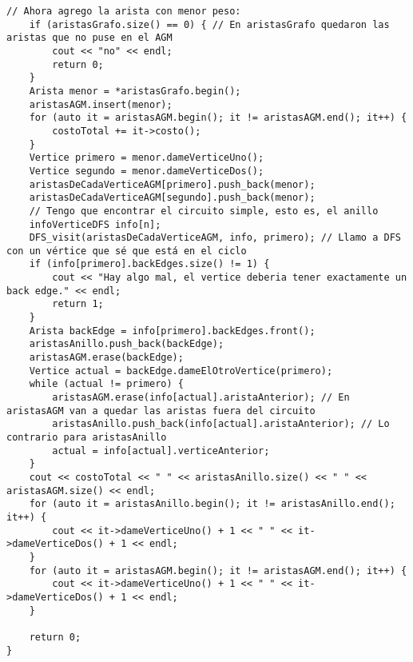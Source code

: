 \begin{lstlisting}[frame=single]
    // Ahora agrego la arista con menor peso:
    if (aristasGrafo.size() == 0) { // En aristasGrafo quedaron las aristas que no puse en el AGM
        cout << "no" << endl;
        return 0;
    }
    Arista menor = *aristasGrafo.begin();
    aristasAGM.insert(menor);
    for (auto it = aristasAGM.begin(); it != aristasAGM.end(); it++) {
        costoTotal += it->costo();
    }
    Vertice primero = menor.dameVerticeUno();
    Vertice segundo = menor.dameVerticeDos();
    aristasDeCadaVerticeAGM[primero].push_back(menor);
    aristasDeCadaVerticeAGM[segundo].push_back(menor);
    // Tengo que encontrar el circuito simple, esto es, el anillo
    infoVerticeDFS info[n];
    DFS_visit(aristasDeCadaVerticeAGM, info, primero); // Llamo a DFS con un vértice que sé que está en el ciclo
    if (info[primero].backEdges.size() != 1) {
        cout << "Hay algo mal, el vertice deberia tener exactamente un back edge." << endl;
        return 1;
    }
    Arista backEdge = info[primero].backEdges.front();
    aristasAnillo.push_back(backEdge);
    aristasAGM.erase(backEdge);
    Vertice actual = backEdge.dameElOtroVertice(primero);
    while (actual != primero) {
        aristasAGM.erase(info[actual].aristaAnterior); // En aristasAGM van a quedar las aristas fuera del circuito
        aristasAnillo.push_back(info[actual].aristaAnterior); // Lo contrario para aristasAnillo
        actual = info[actual].verticeAnterior;
    }
    cout << costoTotal << " " << aristasAnillo.size() << " " << aristasAGM.size() << endl;
    for (auto it = aristasAnillo.begin(); it != aristasAnillo.end(); it++) {
        cout << it->dameVerticeUno() + 1 << " " << it->dameVerticeDos() + 1 << endl;
    }
    for (auto it = aristasAGM.begin(); it != aristasAGM.end(); it++) {
        cout << it->dameVerticeUno() + 1 << " " << it->dameVerticeDos() + 1 << endl;
    }
    
    return 0;
}
\end{lstlisting}
